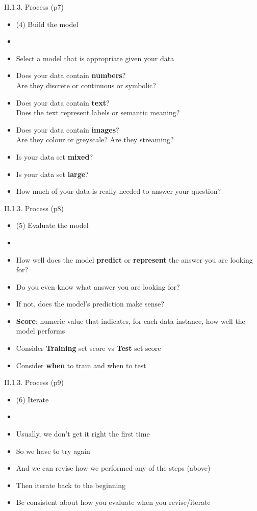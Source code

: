 \documentclass[handout]{beamer}
\newcommand{\strong}[1]{\textbf{\color{teal} #1}}
\newcommand{\stronger}[1]{\textbf{\color{purple} #1}}
\begin{document}
\begin{frame}{II.1.3. Process (p7)}
\begin{itemize}
\item[] (4) Build the model
\item[]
\item Select a model that is appropriate given your data
\item Does your data contain \strong{numbers}?\\
Are they discrete or continuous or symbolic?
\item Does your data contain \strong{text}?\\
Does the text represent labels or semantic meaning?
\item Does your data contain \strong{images}?\\
Are they colour or greyscale? Are they streaming?
\item Is your data set \strong{mixed}?
\item Is your data set \strong{large}?
\item How much of your data is really needed to answer your question?
\end{itemize}
\end{frame}
\begin{frame}{II.1.3. Process (p8)}
\begin{itemize}
\item[] (5) Evaluate the model
\item[]
\item How well does the model \strong{predict} or \strong{represent} the answer you are looking for?
\item Do you even know what answer you are looking for?
\item If not, does the model's prediction make sense?
\item \stronger{Score}: numeric value that indicates, for each data instance, how well the model performs
\item Consider \stronger{Training} set score vs \stronger{Test} set score
\item Consider \strong{when} to train and when to test
\end{itemize}
\end{frame}
\begin{frame}{II.1.3. Process (p9)}
\begin{itemize}
\item[] (6) Iterate
\item[]
\item Usually, we don't get it right the first time
\item So we have to try again
\item And we can revise how we performed any of the steps (above)
\item Then iterate back to the beginning
\item Be consistent about how you evaluate when you revise/iterate
\end{itemize}
\end{frame}
\end{document}
